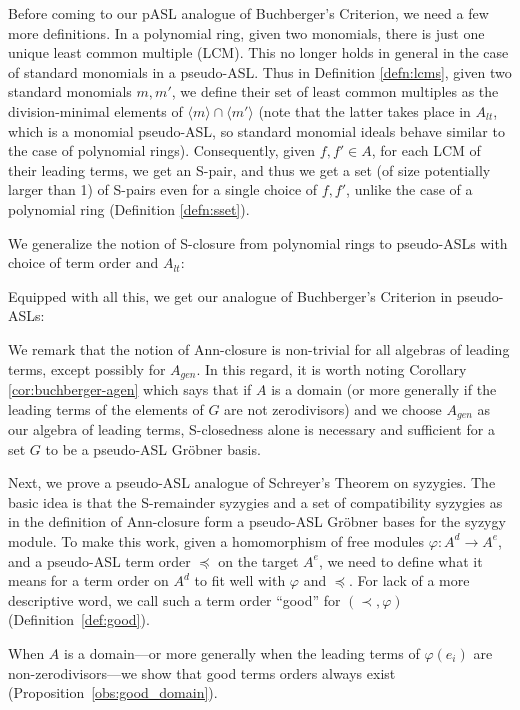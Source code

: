 \documentclass[11pt,reqno]{amsart}
\newcommand{\gb}{Gr\"{o}bner }
\theoremstyle{definition}
\numberwithin{equation}{section}
\begin{document}
Before coming to our pASL analogue of Buchberger's Criterion, we need a few more definitions. In a polynomial ring, given two monomials, there is just one unique least common multiple (LCM). This no longer holds in general in the case of standard monomials in a pseudo-ASL. Thus in Definition \ref{defn:lcms}, given two standard monomials $m,m'$, we define their set of least common multiples as the division-minimal elements of $\langle m \rangle \cap \langle m' \rangle$ (note that the latter takes place in $A_{lt}$, which is a monomial pseudo-ASL, so standard monomial ideals behave similar to the case of polynomial rings). Consequently, given $f, f' \in A$, for each LCM of their leading terms, we get an S-pair, and thus we get a set (of size potentially larger than 1) of S-pairs even for a single choice of $f,f'$, unlike the case of a polynomial ring (Definition \ref{defn:sset}).

We generalize the notion of S-closure from polynomial rings to pseudo-ASLs with choice of term order and $A_{lt}$:


Equipped with all this, we get our analogue of Buchberger's Criterion in pseudo-ASLs:


We remark that the notion of Ann-closure is non-trivial for all algebras of leading terms, except possibly for $A_{gen}$. In this regard, it is worth noting Corollary \ref{cor:buchberger-agen} which says that if $A$ is a domain (or more generally if the leading terms of the elements of $G$ are not zerodivisors) and we choose $A_{gen}$ as our algebra of leading terms, S-closedness alone is necessary and sufficient for a set $G$ to be a pseudo-ASL \gb basis.

\newcommand{\lvsm}{\text{LV}_{sm}}

Next, we prove a pseudo-ASL analogue of Schreyer's Theorem on syzygies. The basic idea is that the S-remainder syzygies and a set of compatibility syzygies as in the definition of Ann-closure form a pseudo-ASL Gröbner bases for the syzygy module. To make this work, given a homomorphism of free modules $\varphi \colon A^d \to A^e$, and a pseudo-ASL term order $\preceq$ on the target $A^e$, we need to define what it means for a term order on $A^d$ to fit well with $\varphi$ and $\preceq$. For lack of a more descriptive word, we call such a term order ``good'' for $(\prec, \varphi)$ (Definition~\ref{def:good}).

When $A$ is a domain---or more generally when the leading terms of $\varphi(e_i)$ are non-zerodivisors---we show that good terms orders always exist (Proposition~\ref{obs:good_domain}).
\end{document}
